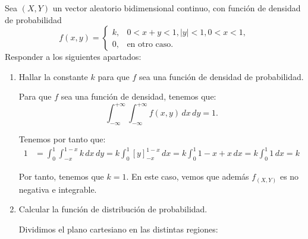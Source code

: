\begin{ejercicio}
    Sea $(X,Y)$ un vector aleatorio bidimensional continuo, con función de densidad de probabilidad
    \[
        f(x, y) = \begin{cases}
            k, & 0 < x + y < 1, |y| < 1, 0 < x < 1, \\
            0, & \text{en otro caso}.
        \end{cases}
    \]
    Responder a los siguientes apartados:
    \begin{enumerate}
        \item Hallar la constante $k$ para que $f$ sea una función de densidad de probabilidad.
        
        Para que $f$ sea una función de densidad, tenemos que:
        \begin{equation*}
            \int_{-\infty}^{+\infty} \int_{-\infty}^{+\infty} f(x, y) \, dx \, dy = 1.
        \end{equation*}

        Tenemos por tanto que:
        \begin{align*}
            1&=\int_{0}^{1} \int_{-x}^{1-x} k \, dx \, dy = k\int_{0}^{1} \left[y\right]_{-x}^{1-x} \, dx = k\int_{0}^{1} 1-x+x \, dx = k\int_{0}^{1} 1 \, dx = k
        \end{align*}

        Por tanto, tenemos que $k=1$. En este caso, vemos que además $f_{(X,Y)}$ es no negativa e integrable.

        \item Calcular la función de distribución de probabilidad.
        
        Dividimos el plano cartesiano en las distintas regiones:
        \begin{figure}[H]
            \centering
\end{figure}
\end{enumerate}
\end{ejercicio}
